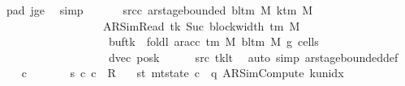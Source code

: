 \begin{isabellebody}
\ pad{}\ jge\ \isamarkupfalse%
\ simp\isanewline
\ \ \isamarkupfalse%
\isanewline
\ \ \isamarkupfalse%
\ src{\isacharunderscore}{\kern0pt}c{}{\isacharcolon}{\kern0pt}\ {\isachardoublequoteopen}ar{\isacharunderscore}{\kern0pt}stage{\isacharunderscore}{\kern0pt}bounded\ {\isacharparenleft}{\kern0pt}bl{\isacharunderscore}{\kern0pt}tm\ M{\isacharparenright}{\kern0pt}\ {\isacharparenleft}{\kern0pt}k{\isacharunderscore}{\kern0pt}tm\ M{\isacharparenright}{\kern0pt}\isanewline
\ \ \ \ \ \ \ \ \ \ \ \ \ \ \ \ \ \ {\isacharparenleft}{\kern0pt}AR{\isacharunderscore}{\kern0pt}SimRead{\isacharcomma}{\kern0pt}\ tk{\isacharcomma}{\kern0pt}\ Suc\ {\isacharparenleft}{\kern0pt}block{\isacharunderscore}{\kern0pt}width\ {\isacharparenleft}{\kern0pt}{\isasymGamma}{\isacharunderscore}{\kern0pt}tm\ M{\isacharparenright}{\kern0pt}{\isacharparenright}{\kern0pt}{\isacharcomma}{\kern0pt}\isanewline
\ \ \ \ \ \ \ \ \ \ \ \ \ \ \ \ \ \ \ buf{\isacharparenleft}{\kern0pt}tk\ {\isacharcolon}{\kern0pt}{\isacharequal}{\kern0pt}\ foldl\ {\isacharparenleft}{\kern0pt}ar{\isacharunderscore}{\kern0pt}acc\ {\isacharparenleft}{\kern0pt}{\isasymGamma}{\isacharunderscore}{\kern0pt}tm\ M{\isacharparenright}{\kern0pt}\ {\isacharparenleft}{\kern0pt}bl{\isacharunderscore}{\kern0pt}tm\ M{\isacharparenright}{\kern0pt}{\isacharparenright}{\kern0pt}\ {\isacharquery}{\kern0pt}g{}\ {\isacharquery}{\kern0pt}cells{}{\isacharparenright}{\kern0pt}{\isacharcomma}{\kern0pt}\isanewline
\ \ \ \ \ \ \ \ \ \ \ \ \ \ \ \ \ \ \ dvec{\isacharcomma}{\kern0pt}\ {\isacharquery}{\kern0pt}posk{\isacharprime}{\kern0pt}{\isacharparenright}{\kern0pt}{\isachardoublequoteclose}\isanewline
\ \ \ \ \isamarkupfalse%
\ src{}\ tk{\isacharunderscore}{\kern0pt}lt\ \isamarkupfalse%
\ {\isacharparenleft}{\kern0pt}auto\ simp{\isacharcolon}{\kern0pt}\ ar{\isacharunderscore}{\kern0pt}stage{\isacharunderscore}{\kern0pt}bounded{\isacharunderscore}{\kern0pt}def{\isacharparenright}{\kern0pt}\isanewline
\ \ \isamarkupfalse%
\ c{}\ \isanewline
\ \ \ \ \ \ s{}{\isacharcolon}{\kern0pt}\ {\isachardoublequoteopen}{\isacharparenleft}{\kern0pt}c{}{\isacharcomma}{\kern0pt}\ c{}{\isacharparenright}{\kern0pt}\ {\isasymin}\ R{\isacharprime}{\kern0pt}{\isachardoublequoteclose}\isanewline
\ \ \ st{}{\isacharcolon}{\kern0pt}\ {\isachardoublequoteopen}mt{\isacharunderscore}{\kern0pt}state\ c{}\ {\isacharequal}{\kern0pt}\ {\isacharparenleft}{\kern0pt}q{\isacharcomma}{\kern0pt}\ AR{\isacharunderscore}{\kern0pt}SimCompute{\isacharcomma}{\kern0pt}\ k{\isacharunderscore}{\kern0pt}unidx\ {}{\isacharcomma}{\kern0pt}\ {}{\isacharcomma}{\kern0pt}\isanewline

\end{isabellebody}
